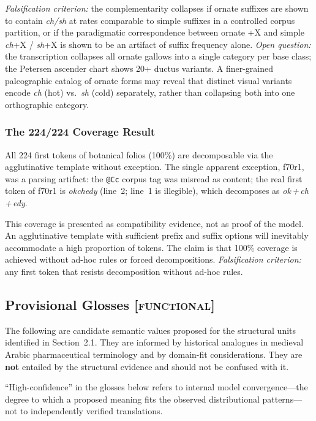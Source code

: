 \documentclass[11pt,a4paper]{article}
\newcommand{\functional}{\textsc{[functional]}}
\begin{document}
\textit{Falsification criterion:} the complementarity collapses if ornate suffixes are shown to contain \textit{ch/sh} at rates comparable to simple suffixes in a controlled corpus partition, or if the paradigmatic correspondence between ornate +X and simple \textit{ch}+X / \textit{sh}+X is shown to be an artifact of suffix frequency alone. \textit{Open question:} the transcription collapses all ornate gallows into a single category per base class; the Petersen ascender chart shows 20+ ductus variants. A finer-grained paleographic catalog of ornate forms may reveal that distinct visual variants encode \textit{ch} (hot) vs.\ \textit{sh} (cold) separately, rather than collapsing both into one orthographic category.

\subsubsection{The 224/224 Coverage Result}

All 224 first tokens of botanical folios (100\%) are decomposable via the agglutinative template without exception. The single apparent exception, f70r1, was a parsing artifact: the \texttt{@Cc} corpus tag was misread as content; the real first token of f70r1 is \textit{okchedy} (line~2; line~1 is illegible), which decomposes as \textit{ok\,+\,ch\,+\,edy}.

This coverage is presented as compatibility evidence, not as proof of the model. An agglutinative template with sufficient prefix and suffix options will inevitably accommodate a high proportion of tokens. The claim is that 100\% coverage is achieved without ad-hoc rules or forced decompositions. \textit{Falsification criterion:} any first token that resists decomposition without ad-hoc rules.

\subsection{Provisional Glosses \functional{}}

The following are candidate semantic values proposed for the structural units identified in Section~2.1. They are informed by historical analogues in medieval Arabic pharmaceutical terminology and by domain-fit considerations. They are \textbf{not} entailed by the structural evidence and should not be confused with it.

``High-confidence'' in the glosses below refers to internal model convergence---the degree to which a proposed meaning fits the observed distributional patterns---not to independently verified translations.
\end{document}
